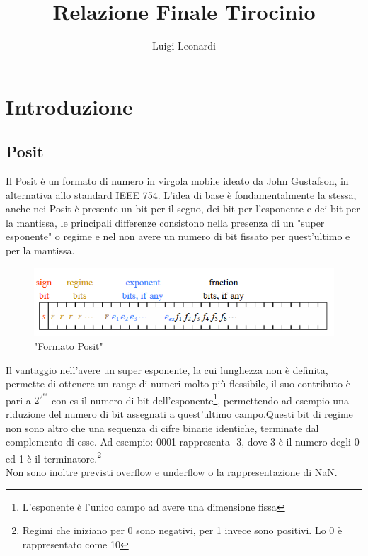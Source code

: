 \documentclass[a4paper,11pt]{article}
\author{Luigi Leonardi}
\title{Relazione Finale Tirocinio}
\date{}
\begin{document}
	\maketitle
	\tableofcontents
	
	

\newpage
	\section{Introduzione}
	\subsection{Posit}

	Il Posit è un formato di numero in virgola mobile ideato da John Gustafson, in alternativa allo standard IEEE 754. L'idea di base è fondamentalmente la stessa, anche nei Posit è presente un bit per il segno, dei bit per l'esponente e dei bit per la mantissa, le principali differenze consistono nella presenza di un "super esponente" o regime e nel non avere un numero di bit fissato per quest'ultimo e per la mantissa. \\
	\begin{figure}[h]
	\includegraphics[scale=0.8]{posit}
	\centering
	\caption{"Formato Posit"}
	\end{figure}Il vantaggio nell'avere un super esponente, la cui lunghezza non è definita, permette di ottenere un range di numeri molto più flessibile, il suo contributo è pari a $2^{2^{es}}$ con es il numero di bit dell'esponente\footnote{L'esponente è l'unico campo ad avere una dimensione fissa}, permettendo ad esempio una riduzione del numero di bit assegnati a quest'ultimo campo.\newline Questi bit di regime non sono altro che una sequenza di cifre binarie identiche, terminate dal complemento di esse. \newline Ad esempio: 0001 rappresenta -3, dove 3 è il numero degli 0 ed 1 è il terminatore.\footnote{Regimi che iniziano per 0 sono negativi, per 1 invece sono positivi. Lo 0 è rappresentato come 10} \\
	Non sono inoltre previsti overflow e underflow o la rappresentazione di NaN.
	
\end{document}
